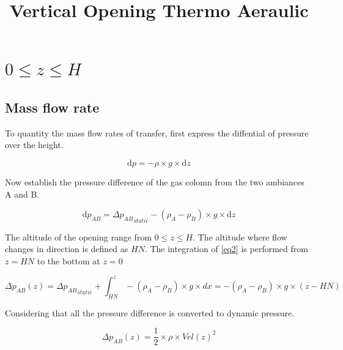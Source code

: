 \documentclass[a4paper, french]{article}
\title{Vertical Opening Thermo Aeraulic}
\begin{document}
    \maketitle         
            
    \section{$0 \leq z \leq H $}
    
        \subsection{Mass flow rate}
            
            To quantity the mass flow rates of transfer, first express the diffential of pressure over the height.

            \begin{equation}
                \label{eq1}
                \mathrm{d}p = -\rho \times g \times \mathrm{d} z
            \end{equation}
            
            Now establish the pressure difference of the gas colomn from the two ambiances A and B.
            
            \begin{equation}
                \label{eq2}
                \mathrm{d}p_{AB} = \Delta {p_{AB}}_{static} -(\rho_A - \rho_B) \times g \times \mathrm{d} z
            \end{equation}       
            
            
            The altitude of the opening range from $ 0 \leq z \leq H $. The altitude where flow changes in direction is defined as $HN$. The integration of \eqref{eq2} is performed from $ z = HN $ to the bottom at $ z = 0 $

            
            \begin{equation}
                \label{eq3}
                \Delta p_{AB}(z) = \Delta {p_{AB}}_{static} + \int_{HN}^{z} -(\rho_A - \rho_B) \times g \times dx = -(\rho_A - \rho_B) \times g \times (z - HN)
            \end{equation} 
            
            Considering that all the pressure difference is converted to dynamic pressure.
            
            \begin{equation}
                \label{eq4}
                \Delta p_{AB}(z) = \frac{1}{2} \times \rho \times Vel(z)^2
            \end{equation}
            
\end{document}
